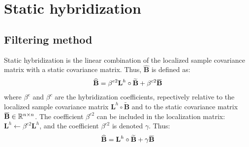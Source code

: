 \documentclass[12pt]{scrartcl}
\newcommand{\overbar}[1]{\mkern 1.5mu\overline{\mkern-1.5mu#1\mkern-1.5mu}\mkern 1.5mu}
\begin{document}
\clearpage

\section{Static hybridization}

\subsection{Filtering method}
Static hybridization is the linear combination of the localized sample covariance matrix with a static covariance matrix. Thus, $\widehat{\mathbf{B}}$ is defined as:
\begin{align}
\widehat{\mathbf{B}} = \beta^{e2} \mathbf{L}^h \circ \widetilde{\mathbf{B}} + \beta^{c2} \overbar{\mathbf{B}}
\end{align}
where $\beta^e$ and $\beta^c$ are the hybridization coefficients, repectively relative to the localized sample covariance matrix $\mathbf{L}^h \circ \widetilde{\mathbf{B}}$ and to the static covariance matrix $\overbar{\mathbf{B}} \in \mathbb{R}^{n \times n}$. The coefficient $\beta^{e2}$ can be included in the localization matrix: $\mathbf{L}^h \leftarrow \beta^{e2} \mathbf{L}^h$, and the coefficient $\beta^{c2}$ is denoted $\gamma$. Thus:
\begin{align}
\widehat{\mathbf{B}} = \mathbf{L}^h \circ \widetilde{\mathbf{B}} + \gamma \overbar{\mathbf{B}}
\end{align}
\end{document}
